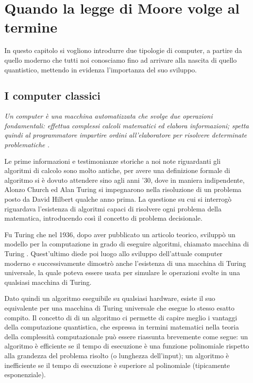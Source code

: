 \chapter{Quando la legge di Moore volge al termine}
In questo capitolo si vogliono introdurre due tipologie di computer, a partire da quello moderno che tutti noi conosciamo fino ad arrivare alla nascita di quello quantistico, mettendo in evidenza l'importanza del suo sviluppo.


\section{I computer classici}
\textit{Un computer è una macchina automatizzata che svolge due operazioni fondamentali: effettua complessi calcoli matematici ed elabora informazioni; spetta quindi al programmatore impartire ordini all'elaboratore per risolvere determinate problematiche \cite{computer2004articolo}.}

Le prime informazioni e testimonianze storiche a noi note riguardanti gli algoritmi di calcolo sono molto antiche, per avere una definizione formale di algoritmo si è dovuto attendere sino agli anni '30, dove in maniera indipendente, Alonzo Church ed Alan Turing si impegnarono nella risoluzione di un problema posto da David Hilbert qualche anno prima.
La questione su cui si interrogò riguardava l'esistenza di algoritmi capaci di risolvere ogni problema della matematica, introducendo così il concetto di problema decisionale.

Fu Turing che nel 1936, dopo aver pubblicato un articolo teorico, sviluppò un modello per la computazione in grado di eseguire algoritmi, chiamato macchina di Turing \cite{turing1936articolo}.
Quest'ultimo diede poi luogo allo sviluppo dell'attuale computer moderno e successivamente dimostrò anche l'esistenza di una macchina di Turing universale, la quale poteva essere usata per simulare le operazioni svolte in una qualsiasi macchina di Turing.

Dato quindi un algoritmo eseguibile su qualsiasi hardware, esiste il suo equivalente per una macchina di Turing universale che esegue lo stesso esatto compito.
Il concetto di  \cite{dipierro2013articolo} di un algoritmo ci permette di capire meglio i vantaggi della computazione quantistica, che espressa in termini matematici nella teoria della complessità computazionale può essere riassunta brevemente come segue: un algoritmo è efficiente se il tempo di esecuzione è una funzione polinomiale rispetto alla grandezza del problema risolto (o lunghezza dell'input); un algoritmo è inefficiente se il tempo di esecuzione è superiore al polinomiale (tipicamente esponenziale).

